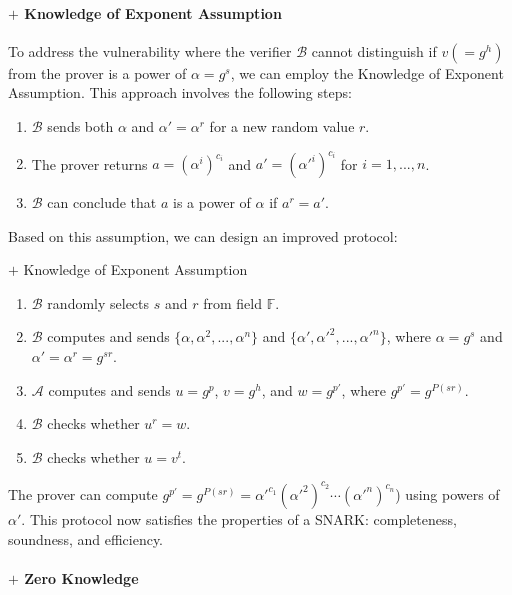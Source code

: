 \documentclass{article}
\begin{document}
\paragraph{$+$ Knowledge of Exponent Assumption}

To address the vulnerability where the verifier $\mathcal{B}$ cannot distinguish if $v (= g^h)$ from the prover is a power of $\alpha = g^s$, we can employ the Knowledge of Exponent Assumption. This approach involves the following steps:

\begin{enumerate}
    \item $\mathcal{B}$ sends both $\alpha$ and $\alpha' = \alpha^r$ for a new random value $r$.
    \item The prover returns $a = (\alpha^i)^{c_i}$ and $a' = (\alpha'^i)^{c_i}$ for $i = 1, ..., n$.
    \item $\mathcal{B}$ can conclude that $a$ is a power of $\alpha$ if $a^r = a'$.
\end{enumerate}

Based on this assumption, we can design an improved protocol:

\begin{protocol}{$+$ Knowledge of Exponent Assumption}{}
\begin{enumerate}
    \item $\mathcal{B}$ randomly selects $s$ and $r$ from field $\mathbb{F}$.
    \item $\mathcal{B}$ computes and sends $\{\alpha, \alpha^2, ..., \alpha^{n}\}$ and $\{\alpha', \alpha'^2, ..., \alpha'^{n}\}$, where $\alpha = g^{s}$ and $\alpha' = \alpha^{r} = g^{sr}$.
    \item $\mathcal{A}$ computes and sends $u = g^{p}$, $v = g^{h}$, and $w = g^{p'}$, where $g^{p'} = g^{P(sr)}$.
    \item $\mathcal{B}$ checks whether $u^{r} = w$.
    \item $\mathcal{B}$ checks whether $u = v^{t}$.
\end{enumerate}
\end{protocol}

The prover can compute $g^{p'} = g^{P(sr)} = \alpha'^{c_1} (\alpha'^{2})^{c_2} \cdots (\alpha'^{n})^{c_n}$) using powers of $\alpha'$. This protocol now satisfies the properties of a SNARK: completeness, soundness, and efficiency.

\paragraph{$+$ Zero Knowledge}
\end{document}

